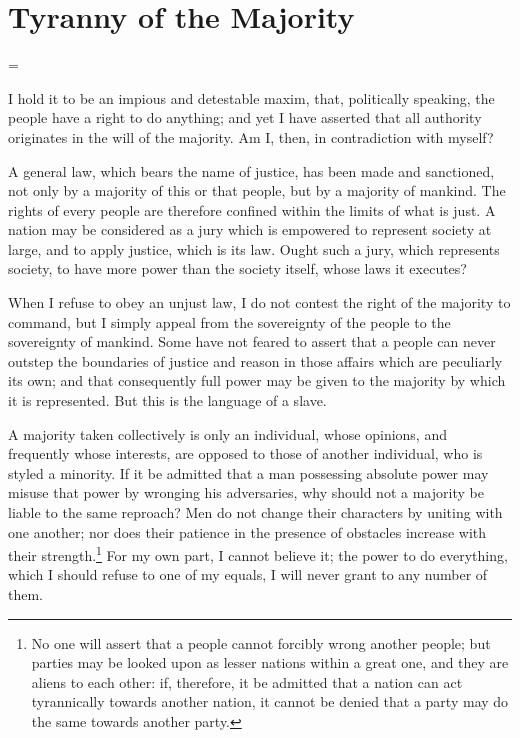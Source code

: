 
\author{Alexis de Tocqueville}
\chapter[Alexis de Tocqueville -- Tyranny of the Majority]{Tyranny of
the Majority}



\hangindent=\parindent
{}

\vspace{1\baselineskip}

I hold it to be an impious and detestable maxim, that, politically
speaking, the people have a right to do anything; and yet I have
asserted that all authority originates in the will of the majority. Am
I, then, in contradiction with myself?

A general law, which bears the name of justice, has been made and
sanctioned, not only by a majority of this or that people, but by a
majority of mankind. The rights of every people are therefore confined
within the limits of what is just. A nation may be considered as a
jury which is empowered to represent society at large, and to apply
justice, which is its law. Ought such a jury, which represents
society, to have more power than the society itself, whose laws it
executes?

When I refuse to obey an unjust law, I do not contest the right of the
majority to command, but I simply appeal from the sovereignty of the
people to the sovereignty of mankind. Some have not feared to assert
that a people can never outstep the boundaries of justice and reason
in those affairs which are peculiarly its own; and that consequently
full power may be given to the majority by which it is represented.
But this is the language of a slave.

A majority taken collectively is only an individual, whose opinions,
and frequently whose interests, are opposed to those of another
individual, who is styled a minority. If it be admitted that a man
possessing absolute power may misuse that power by wronging his
adversaries, why should not a majority be liable to the same
 reproach? Men do not change their characters by uniting
with one another; nor does their patience in the presence of obstacles
increase with their strength.\footnote{No one will assert that a
people cannot forcibly wrong another people; but parties may be looked
upon as lesser nations within a great one, and they are aliens to each
other: if, therefore, it be admitted that a nation can act
tyrannically towards another nation, it cannot be denied that a party
may do the same towards another party.} For my own part, I cannot
believe it; the power to do everything, which I should refuse to one
of my equals, I will never grant to any number of them.

